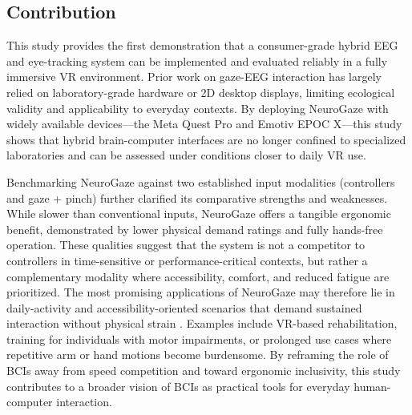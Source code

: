 \documentclass[utf8]{FrontiersinHarvard} %
\begin{document}
\subsection{Contribution}
This study provides the first demonstration that a consumer-grade hybrid EEG and eye-tracking system can be implemented and evaluated reliably in a fully immersive VR environment. Prior work on gaze-EEG interaction has largely relied on laboratory-grade hardware or 2D desktop displays, limiting ecological validity and applicability to everyday contexts. By deploying NeuroGaze with widely available devices—the Meta Quest Pro and Emotiv EPOC X—this study shows that hybrid brain-computer interfaces are no longer confined to specialized laboratories and can be assessed under conditions closer to daily VR use.

Benchmarking NeuroGaze against two established input modalities (controllers and gaze + pinch) further clarified its comparative strengths and weaknesses. While slower than conventional inputs, NeuroGaze offers a tangible ergonomic benefit, demonstrated by lower physical demand ratings and fully hands-free operation. These qualities suggest that the system is not a competitor to controllers in time-sensitive or performance-critical contexts, but rather a complementary modality where accessibility, comfort, and reduced fatigue are prioritized.
The most promising applications of NeuroGaze may therefore lie in daily-activity  and accessibility-oriented scenarios that demand sustained interaction without physical strain \citep{Sellers01102010}. Examples include VR-based rehabilitation, training for individuals with motor impairments, or prolonged use cases where repetitive arm or hand motions become burdensome. By reframing the role of BCIs away from speed competition and toward ergonomic inclusivity, this study contributes to a broader vision of BCIs as practical tools for everyday human-computer interaction.
\end{document}

